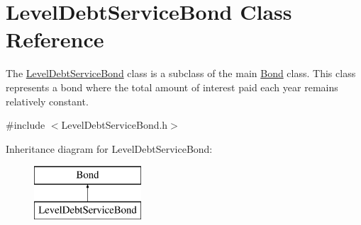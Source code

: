 \hypertarget{classLevelDebtServiceBond}{}\section{Level\+Debt\+Service\+Bond Class Reference}
\label{classLevelDebtServiceBond}


The {\ttfamily \mbox{\hyperlink{classLevelDebtServiceBond}{Level\+Debt\+Service\+Bond}}} class is a subclass of the main {\ttfamily \mbox{\hyperlink{classBond}{Bond}}} class. This class represents a bond where the total amount of interest paid each year remains relatively constant.  




{\ttfamily \#include $<$Level\+Debt\+Service\+Bond.\+h$>$}

Inheritance diagram for Level\+Debt\+Service\+Bond\+:\begin{figure}[H]
\begin{center}
\leavevmode
\includegraphics[height=2.000000cm]{classLevelDebtServiceBond}
\end{center}
\end{figure}
